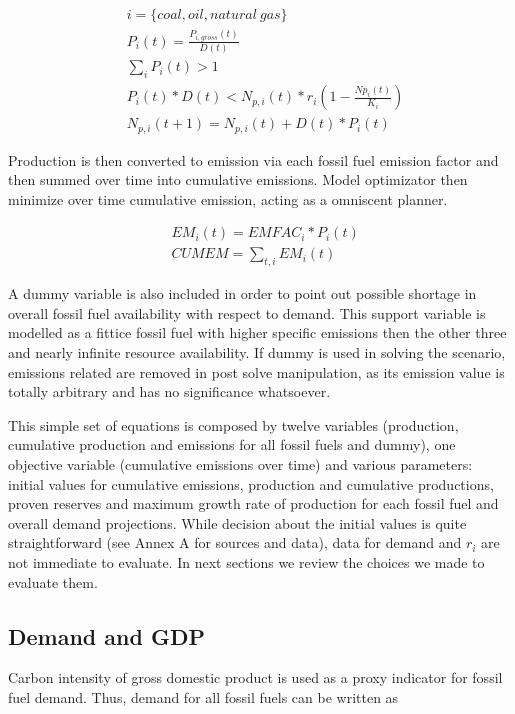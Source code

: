 \documentclass[11pt]{article} %
\begin{document}
\begin{align}
&i = \{coal, oil, natural\ gas\}  \\
&P_i(t) = \frac{P_{i,gross}(t)}{D(t)} \\
&\sum_{i}{P_i(t)} > 1 \\ \label{s2e1}
&P_i(t) * D(t) < N_{p,i}(t) * r_i (1 - \frac {Np_i(t)}{K_i} ) \\ \label{s2e2}
& N_{p,i}(t+1) = N_{p,i}(t) + D(t)*P_i(t)
\end{align}

Production is then converted to emission via each fossil fuel emission factor and then summed over time into cumulative emissions. Model optimizator then minimize over time cumulative emission, acting as a omniscent planner.

\begin{align}
& EM_i(t) = EMFAC_i * P_i(t) \\
& CUMEM = \sum_{t,i} EM_i(t)
\end{align}

A dummy variable is also included in order to point out possible shortage in overall fossil fuel availability with respect to demand. This support variable is modelled as a fittice fossil fuel with higher specific emissions then the other three and nearly infinite resource availability. If dummy is used in solving the scenario, emissions related are removed in post solve manipulation, as its emission value is totally arbitrary and has no significance whatsoever.

This simple set of equations is composed by twelve variables (production, cumulative production and emissions for all fossil fuels and dummy), one objective variable (cumulative emissions over time) and various parameters: initial values for cumulative emissions, production and cumulative productions, proven reserves and maximum growth rate of production for each fossil fuel and overall demand projections. While decision about the initial values is quite straightforward (see Annex A for sources and data), data for demand and $r_i$ are not immediate to evaluate. 
In next sections we review the choices we made to evaluate them.

\subsection {Demand and GDP}
Carbon intensity of gross domestic product is used as a proxy indicator for fossil fuel demand. Thus, demand for all fossil fuels can be written as
\end{document}
